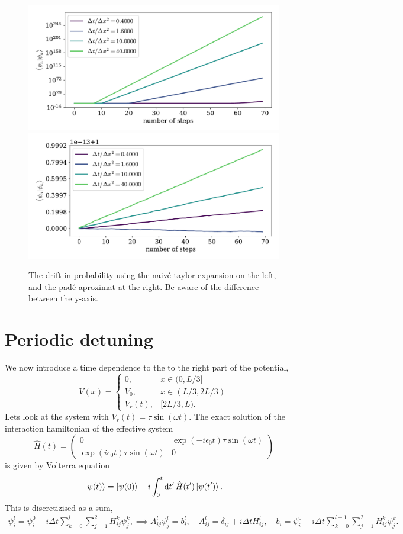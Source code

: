 \documentclass{article}
\begin{document}
    \begin{figure}[ht]
        \centering
        \includegraphics[width=.49\textwidth]{box_w_barrier/step_errorlog.pdf}
        \includegraphics[width=.49\textwidth]{box_w_barrier/step_error.pdf}
        \caption{The drift in probability using the naivé taylor expansion on the left, and the padé aproximat at the right. Be aware of the difference between the y-axis.}
        \label{fig:step_error}
        
    \end{figure}

\section*{Periodic detuning}
    We now introduce a time dependence to the to the right part of the potential, 
    \begin{equation*}
        V(x) = 
        \begin{cases}
            0, & x \in (0, L/3] \\
            V_0, & x \in (L/3, 2L/3) \\
            V_r(t), & [2L/3, L).
        \end{cases}
    \end{equation*}
    Lets look at the system with $V_r(t) = \tau \sin(\omega t)$. The exact solution of the interaction hamiltonian of the effective system
    \begin{equation*}
        \hat H(t) = 
        \begin{pmatrix}
            0 & \exp(-i \epsilon_0 t) \tau \sin(\omega t)\\
            \exp(i \epsilon_0 t) \tau \sin(\omega t) & 0
        \end{pmatrix}
    \end{equation*}
    is given by Volterra equation
    \begin{equation*}
        \ket{\psi(t)} = \ket{\psi(0)} - i\int_0^t \dd{t'} \hat H(t')\ket{\psi(t')}.
    \end{equation*}
    This is discretizised as a sum,
    \begin{align*}
        \psi_i^l = \psi_i^0 - i \Delta t \sum_{k=0}^{l} \sum_{j=1}^2 H_{ij}^k \psi_j^k, \implies A_{ij}^l \psi_j^l = b_i^l, \quad A_{ij}^l = \delta_{ij} + i\Delta t H_{ij}^l, \quad b_i = \psi_i^0 - i \Delta t \sum_{k=0}^{l-1} \sum_{j=1}^2 H_{ij}^k \psi_j^k.
    \end{align*}
\end{document}
